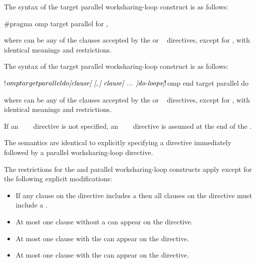 \syntax
\begin{ccppspecific}
The syntax of the target parallel worksharing-loop construct is as follows:

\begin{ompcPragma}
#pragma omp target parallel for \plc{[clause[ [},\plc{] clause] ... ] new-line}
\end{ompcPragma}

where  can be any of the clauses accepted by the  or
~ directives, except for , with identical meanings and restrictions.
\end{ccppspecific}

\begin{fortranspecific}
The syntax of the target parallel worksharing-loop construct is as follows:

\begin{ompfPragma}
!$omp target parallel do \plc{[clause[ [},\plc{] clause] ... ]}
    \plc{do-loops}
\plc{[}!$omp end target parallel do\plc{]}
\end{ompfPragma}

where  can be any of the clauses accepted by the  or
~ directives, except for , with identical meanings and restrictions.

If an ~~~ directive is not specified, an
~~~ directive is assumed at the end of
the .
\end{fortranspecific}

\descr
The semantics are identical to explicitly specifying a  directive
immediately followed by a parallel worksharing-loop directive.


\restrictions
The restrictions for the  and parallel worksharing-loop constructs apply except for the following explicit modifications:

\begin{itemize}
\item If any  clause on the directive includes a
       then all  clauses
      on the directive must include a .

\item At most one  clause without a
       can appear on the directive.

\item At most one  clause with the 
       can appear on the directive.


\item At most one  clause with the 
       can appear on the directive.
\end{itemize}

